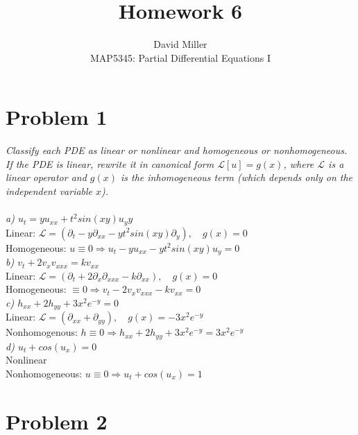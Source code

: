 \documentclass[12pt]{article}
\theoremstyle{remark}
\begin{document}
 
\title{Homework 6}
\author{David Miller \\ 
MAP5345: Partial Differential Equations I} 
 
\maketitle

\section*{Problem 1}

\textit{Classify each PDE as linear or nonlinear and homogeneous or nonhomogeneous. If the PDE is linear, rewrite it in canonical form $\mathcal{L}[u] = g(x)$, where $\mathcal{L}$ is a linear operator and $g(x)$ is the inhomogeneous term (which depends only on the independent variable $x$).} \\ \\
\textit{a) $u_t = yu_{xx} + t^2sin(xy)u_yy$} \\ 

Linear: $\mathcal{L} = (\partial_t - y\partial_{xx} - yt^2sin(xy)\partial_y), \quad g(x) = 0$ \\
Homogeneous: $u \equiv 0 \Rightarrow u_t - yu_{xx} -yt^2sin(xy)u_y = 0$ \\

\textit{b) $v_t + 2v_xv_{xxx} = kv_{xx}$} \\

Linear: $\mathcal{L} = (\partial_t + 2\partial_x\partial_{xxx} - k\partial_{xx}), \quad g(x) = 0$ \\
Homogeneous: $ \equiv 0 \Rightarrow v_t - 2v_xv_{xxx} - kv_{xx} = 0$ \\

\textit{c) $h_{xx} + 2h_{yy} + 3x^2e^{-y} = 0$}\\ 

Linear: $\mathcal{L} = (\partial_{xx} + \partial_{yy}), \quad g(x) = -3x^2e^{-y}$ \\
Nonhomogenous: $h \equiv 0 \Rightarrow h_{xx} + 2h_{yy} + 3x^2e^{-y} = 3x^2e^{-y}$ \\

\textit{d) $u_t + cos(u_x) = 0$} \\ 

Nonlinear \\
Nonhomogeneous: $u \equiv 0 \Rightarrow u_t + cos(u_x) = 1$

\pagebreak

\section*{Problem 2}
\end{document}
